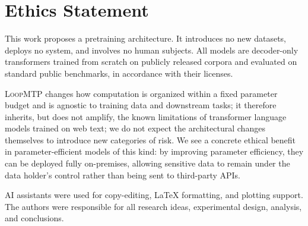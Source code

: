 \documentclass[11pt]{article}
\begin{document}
\section{Ethics Statement}

This work proposes a pretraining architecture. It introduces no new datasets,
deploys no system, and involves no human subjects. All models are decoder-only
transformers trained from scratch on publicly released corpora and evaluated on
standard public benchmarks, in accordance with their licenses.

\textsc{LoopMTP} changes how computation is organized within a fixed parameter budget and is agnostic to training data and downstream tasks; it therefore inherits, but does not amplify, the known limitations of transformer language models trained on web text; we do not expect the architectural changes themselves to introduce new categories of risk.
We see a concrete ethical benefit in parameter-efficient models of this kind: by improving parameter efficiency, they can be deployed fully on-premises, allowing sensitive data to remain under the data holder's control rather than being sent to third-party APIs. 

AI assistants were used for copy-editing, LaTeX formatting, and plotting
support. The authors were responsible for all research ideas, experimental design, analysis, and conclusions.





\clearpage

\appendix
\label{sec:appendix}






\end{document}
